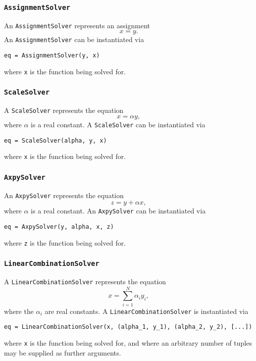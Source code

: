 \documentclass[11pt]{article}
\begin{document}
\subsubsection{\texttt{AssignmentSolver}}

An \texttt{AssignmentSolver} represents an assignment
\begin{equation*}
  x = y.
\end{equation*}
An \texttt{AssignmentSolver} can be instantiated via
\begin{lstlisting}
eq = AssignmentSolver(y, x)
\end{lstlisting}
where \texttt{x} is the function being solved for.

\subsubsection{\texttt{ScaleSolver}}

A \texttt{ScaleSolver} represents the equation
\begin{equation*}
  x = \alpha y,
\end{equation*}
where $\alpha$ is a real constant. A \texttt{ScaleSolver} can be instantiated
via
\begin{lstlisting}
eq = ScaleSolver(alpha, y, x)
\end{lstlisting}
where \texttt{x} is the function being solved for.

\subsubsection{\texttt{AxpySolver}}

An \texttt{AxpySolver} represents the equation
\begin{equation*}
  z = y + \alpha x,
\end{equation*}
where $\alpha$ is a real constant. An \texttt{AxpySolver} can be instantiated
via
\begin{lstlisting}
eq = AxpySolver(y, alpha, x, z)
\end{lstlisting}
where \texttt{z} is the function being solved for.

\subsubsection{\texttt{LinearCombinationSolver}}

A \texttt{LinearCombinationSolver} represents the equation
\begin{equation*}
  x = \sum_{i = 1}^N \alpha_i y_i,
\end{equation*}
where the $\alpha_i$ are real constants. A \texttt{LinearCombinationSolver} is
instantiated via
\begin{lstlisting}
eq = LinearCombinationSolver(x, (alpha_1, y_1), (alpha_2, y_2), [...])
\end{lstlisting}
where \texttt{x} is the function being solved for, and where an arbitrary
number of tuples may be supplied as further arguments.
\end{document}
